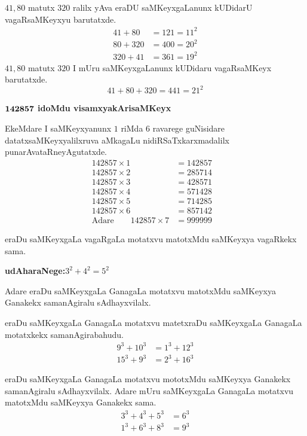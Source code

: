 $41,80$ \;matutx\; $320$\; ralilx yAva eraDU saMKeyxgaLanunx kUDidarU vagaR\-saMKeyxyu barutatxde.
\begin{align*}
41+80 &=121=11^2\\
80+320 &= 400 = 20^2\\
320+41 &=361 = 19^2
\end{align*}
$41,80$\; matutx \;$320$\; I mUru saMKeyxgaLanunx kUDidaru vagaRsaMKeyx barutatxde. 
$$
41+80+320 = 441 = 21^2
$$

\begin{flushleft}
{\bf $\bf 142857$ idoMdu visamxyakArisaMKeyx}
\end{flushleft}

EkeMdare I saMKeyxyanunx $1$ riMda $6$ ravarege guNisidare datatxsaMKeyxyalilxruva aMkagaLu nidiRSaTxkarxmadalilx punarAvataRneyAgutatxde.
\begin{align*}
142857 \times 1 &= 142857&\\
142857 \times 2 &= 285714&\\
142857 \times 3 &= 428571&\\
142857 \times 4 &= 571428&\\
142857 \times 5 &= 714285&\\
142857 \times 6 &= 857142&\\
\text{Adare}\qquad 142857 \times 7 &= 999999&
\end{align*}

\vfill\eject
eraDu saMKeyxgaLa vagaRgaLa motatxvu matotxMdu saMKeyxya vagaRkekx sama.

\textbf{udAharaNege:}\qquad $3^2+4^2 = 5^2$

Adare eraDu saMKeyxgaLa GanagaLa motatxvu matotxMdu saMKeyxya Ganakekx sama\-nAgiralu sAdhayxvilalx.

eraDu saMKeyxgaLa GanagaLa motatxvu matetxraDu saMKeyxgaLa GanagaLa motatxkekx sama\-nAgirabahudu.
\begin{align*}
9^3+10^3 &= 1^3+12^3\\
15^3+9^3 &= 2^3+ 16^3
\end{align*}

eraDu saMKeyxgaLa GanagaLa motatxvu mototxMdu saMKeyxya Ganakekx samanAgiralu sAdhayxvilalx. Adare mUru saMKeyxgaLa GanagaLa motatxvu matotxMdu saMKeyxya Ganakekx sama.
\begin{align*}
3^3+4^3+5^3 &=6^3\\
1^3+6^3+8^3 &= 9^3
\end{align*}

